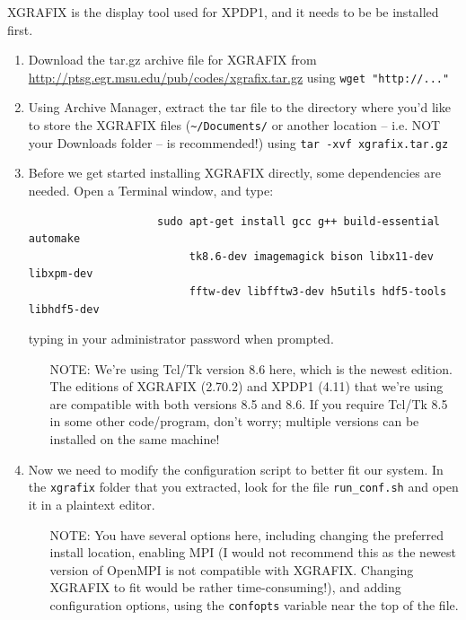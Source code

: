 \documentclass{article}
\begin{document}
	\noindent XGRAFIX is the display tool used for XPDP1, and it needs to be be installed first.
	\begin{enumerate}
		\item Download the tar.gz archive file for XGRAFIX from \\ \url{http://ptsg.egr.msu.edu/pub/codes/xgrafix.tar.gz} using \verb|wget "http://..."|
		
		\item Using Archive Manager, extract the tar file to the directory where you'd like to store the XGRAFIX files (\verb|~/Documents/| or another location -- i.e. NOT your Downloads folder -- is recommended!) using \verb|tar -xvf xgrafix.tar.gz|
		
		\item Before we get started installing XGRAFIX directly, some dependencies are needed. Open a Terminal window, and type:
		\begin{verbatim}
			        sudo apt-get install gcc g++ build-essential automake 
			             tk8.6-dev imagemagick bison libx11-dev libxpm-dev
			             fftw-dev libfftw3-dev h5utils hdf5-tools libhdf5-dev
		\end{verbatim}
		
		typing in your administrator password when prompted.
		\begin{enumerate}
			\item[NOTE:] We're using Tcl/Tk version 8.6 here, which is the newest edition. The editions of XGRAFIX (2.70.2) and XPDP1 (4.11) that we're using are compatible with both versions 8.5 and 8.6. If you require Tcl/Tk 8.5 in some other code/program, don't worry; multiple versions can be installed on the same machine!
		\end{enumerate}
		
		\item Now we need to modify the configuration script to better fit our system. In the \verb|xgrafix| folder that you extracted, look for the file \verb|run_conf.sh| and open it in a plaintext editor. 
		\begin{enumerate} 
			\item[NOTE:] You have several options here, including changing the preferred install location, enabling MPI (I would not recommend this as the newest version of OpenMPI is not compatible with XGRAFIX. Changing XGRAFIX to fit would be rather time-consuming!), and adding configuration options, using the \verb|confopts| variable near the top of the file. 
		\end{enumerate}
		

\end{enumerate}
\end{document}
